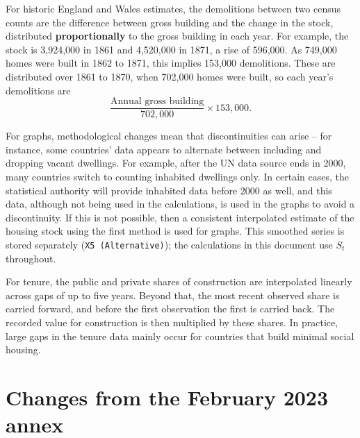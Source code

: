 \documentclass[11pt,a4paper]{article}
\newcommand{\code}[1]{\texttt{#1}}
\begin{document}
For historic England and Wales estimates, the demolitions between two census counts are
the difference between gross building and the change in the stock, distributed
\textbf{proportionally} to the gross building in each year. For example, the stock is
3,924,000 in 1861 and 4,520,000 in 1871, a rise of 596,000. As 749,000 homes were built in
1862 to 1871, this implies 153,000 demolitions. These are distributed over 1861 to 1870,
when 702,000 homes were built, so each year's demolitions are
\[
  \frac{\text{Annual gross building}}{702{,}000} \times 153{,}000.
\]

For graphs, methodological changes mean that discontinuities can arise -- for instance,
some countries' data appears to alternate between including and dropping vacant
dwellings. For example, after the UN data source ends in 2000, many countries switch to
counting inhabited dwellings only. In certain cases, the statistical authority will provide
inhabited data before 2000 as well, and this data, although not being used in the
calculations, is used in the graphs to avoid a discontinuity. If this is not possible, then
a consistent interpolated estimate of the housing stock using the first method is used for
graphs. This smoothed series is stored separately (\code{X5 (Alternative)}); the
calculations in this document use $S_t$ throughout.

For tenure, the public and private shares of construction are interpolated linearly across
gaps of up to five years. Beyond that, the most recent observed share is carried forward,
and before the first observation the first is carried back. The recorded value for
construction is then multiplied by these shares. In practice, large gaps in the tenure
data mainly occur for countries that build minimal social housing.

\section*{Changes from the February 2023 annex}
\end{document}
